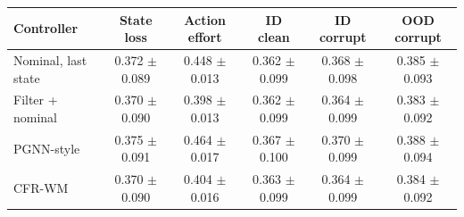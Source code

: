 \begin{tabular}{lccccc}
\toprule
Controller & State loss & Action effort & ID clean & ID corrupt & OOD corrupt \\
\midrule
Nominal, last state & 0.372 $\pm$ 0.089 & 0.448 $\pm$ 0.013 & 0.362 $\pm$ 0.099 & 0.368 $\pm$ 0.098 & 0.385 $\pm$ 0.093 \\
Filter + nominal & 0.370 $\pm$ 0.090 & 0.398 $\pm$ 0.013 & 0.362 $\pm$ 0.099 & 0.364 $\pm$ 0.099 & 0.383 $\pm$ 0.092 \\
PGNN-style & 0.375 $\pm$ 0.091 & 0.464 $\pm$ 0.017 & 0.367 $\pm$ 0.100 & 0.370 $\pm$ 0.099 & 0.388 $\pm$ 0.094 \\
CFR-WM & 0.370 $\pm$ 0.090 & 0.404 $\pm$ 0.016 & 0.363 $\pm$ 0.099 & 0.364 $\pm$ 0.099 & 0.384 $\pm$ 0.092 \\
\bottomrule
\end{tabular}
